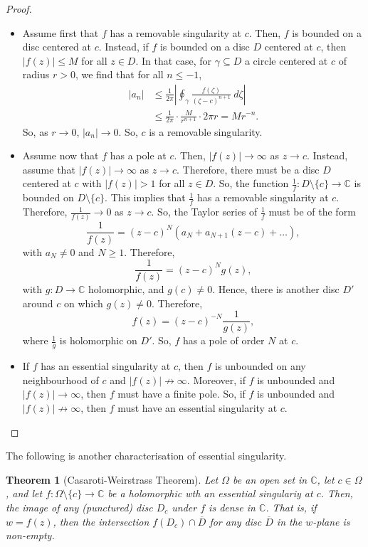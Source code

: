 \documentclass[a4paper, openany]{memoir}
\theoremstyle{definition}
\theoremstyle{plain}
\newtheorem{theorem}[definition]{Theorem}
\begin{document}
\begin{proof}
\hspace*{0pt}
\begin{itemize}
    \item Assume first that $f$ has a removable singularity at $c$. Then, $f$ is bounded on a disc centered at $c$. Instead, if $f$ is bounded on a disc $D$ centered at $c$, then $|f(z)| \leq M$ for all $z \in D$. In that case, for $\gamma \subseteq D$ a circle centered at $c$ of radius $r > 0$, we find that for all $n \leq -1$,
    \begin{align*}
        |a_n| &\leq \frac{1}{2\pi} \left|\oint_\gamma \frac{f(\zeta)}{(\zeta - c)^{n+1}} \ d\zeta \right| \\
        &\leq \frac{1}{2\pi} \cdot \frac{M}{r^{n+1}} \cdot 2\pi r = Mr^{-n}.
    \end{align*}
    So, as $r \to 0$, $|a_n| \to 0$. So, $c$ is a removable singularity.
    
    \item Assume now that $f$ has a pole at $c$. Then, $|f(z)| \to \infty$ as $z \to c$. Instead, assume that $|f(z)| \to \infty$ as $z \to c$. Therefore, there must be a disc $D$ centered at $c$ with $|f(z)| > 1$ for all $z \in D$. So, the function $\frac{1}{f}: D \setminus \{c\} \to \mathbb{C}$ is bounded on $D \setminus \{c\}$. This implies that $\frac{1}{f}$ has a removable singularity at $c$. Therefore, $\frac{1}{f(z)} \to 0$ as $z \to c$. So, the Taylor series of $\frac{1}{f}$ must be of the form
    \[\frac{1}{f(z)} = (z - c)^N (a_N + a_{N+1} (z - c) + \dots),\]
    with $a_N \neq 0$ and $N \geq 1$. Therefore, 
    \[\frac{1}{f(z)} = (z - c)^N g(z),\]
    with $g: D \to \mathbb{C}$ holomorphic, and $g(c) \neq 0$. Hence, there is another disc $D'$ around $c$ on which $g(z) \neq 0$. Therefore,
    \[f(z) = (z - c)^{-N} \frac{1}{g(z)},\]
    where $\frac{1}{g}$ is holomorphic on $D'$. So, $f$ has a pole of order $N$ at $c$.
    
    \item If $f$ has an essential singularity at $c$, then $f$ is unbounded on any neighbourhood of $c$ and $|f(z)| \not\to \infty$. Moreover, if $f$ is unbounded and $|f(z)| \to \infty$, then $f$ must have a finite pole. So, if $f$ is unbounded and $|f(z)| \not\to \infty$, then $f$ must have an essential singularity at $c$.
\end{itemize}
\end{proof}
The following is another characterisation of essential singularity.
\begin{theorem}[Casaroti-Weirstrass Theorem]
    Let $\Omega$ be an open set in $\mathbb{C}$, let $c \in \Omega$, and let $f: \Omega \setminus \{c\} \to \mathbb{C}$ be a holomorphic wth an essential singulariy at $c$. Then, the image of any (punctured) disc $D_c$ under $f$ is dense in $\mathbb{C}$. That is, if $w = f(z)$, then the intersection $f(D_c) \cap \overline{D}$ for any disc $\overline{D}$ in the $w$-plane is non-empty.
\end{theorem}
\end{document}
